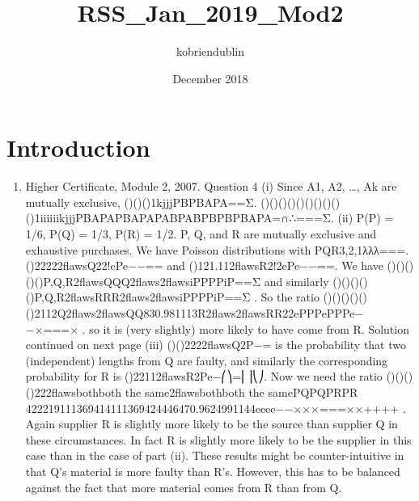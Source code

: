 \documentclass{article}
\title{RSS_Jan_2019_Mod2}
\author{kobriendublin }
\date{December 2018}
\begin{document}
\maketitle

\section{Introduction}

\begin{enumerate}
    \item 
Higher Certificate, Module 2, 2007. Question 4
(i) Since A1, A2, …, Ak are mutually exclusive, ()()()1kjjjPBPBAPA==Σ.
()()()()()()()()()()1iiiiiikjjjPBAPAPBAPAPABPABPBPBPBAPA=∩∴===Σ.
(ii) P(P) = 1/6, P(Q) = 1/3, P(R) = 1/2. P, Q, and R are mutually exclusive and exhaustive purchases.
We have Poisson distributions with PQR3,2,1λλλ===.
()22222flawsQ22!ePe−−== and ()121.112flawsR2!2ePe−−==.
We have ()()()()()P,Q,R2flawsQQQ2flaws2flawsiPPPPiP==Σ
and similarly ()()()()()P,Q,R2flawsRRR2flaws2flawsiPPPPiP==Σ .
So the ratio ()()()()()()2112Q2flaws2flawsQQ830.981113R2flaws2flawsRR22ePPPePPPe−−×===× .
so it is (very slightly) more likely to have come from R.
Solution continued on next page
(iii) (){}()2222flawsQ2P−= is the probability that two (independent) lengths from Q are faulty, and similarly the corresponding probability for R is (){}22112flawsR2Pe−⎛⎞=⎜⎟⎝⎠.
Now we need the ratio
(){}()(){}()222flawsbothboth the same2flawsbothboth the samePQPQPRPR
422219111369414111369424446470.9624991144eeee−−×××===××++++ .
Again supplier R is slightly more likely to be the source than supplier Q in these circumstances. In fact R is slightly more likely to be the supplier in this case than in the case of part (ii).
These results might be counter-intuitive in that Q's material is more faulty than R's. However, this has to be balanced against the fact that more material comes from R than from Q.
\end{enumerate}
\end{document}
